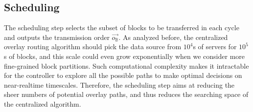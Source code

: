 

\subsection{Scheduling}
\label{subsec:logic:scheduling}

The scheduling step
selects the subset of blocks to be transferred in each cycle and
outputs the transmission order $\overrightarrow{o_\mathbb{B}}$. As analyzed before, the centralized overlay routing algorithm should pick the data source from $10^4$s of servers for $10^5$s of blocks, and this scale could even grow exponentially when we consider more fine-grained block partitions. Such computational complexity makes it intractable for the controller to explore all the possible paths to make optimal decisions on near-realtime timescales. Therefore, the scheduling step aims at reducing the sheer numbers of potential overlay paths, and thus reduces the searching space of the centralized algorithm.

